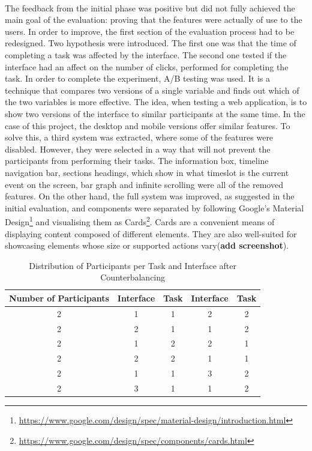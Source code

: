 \documentclass{l4proj}
\begin{document}
\paragraph{}
The feedback from the initial phase was positive but did not fully achieved the main goal of the evaluation: proving that the features were actually of use to the users. In order to improve, the first section of the evaluation process had to be redesigned. Two hypothesis were introduced. The first one was that the time of completing a task was affected by the interface. The second one tested if the interface had an affect on the number of clicks, performed for completing the task. In order to complete the experiment, A/B testing was used. It is a technique that compares two versions of a single variable and finds out which of the two variables is more effective. The idea, when testing a web application, is to show two versions of the interface to similar participants at the same time. In the case of this project, the desktop and mobile versions offer similar features. To solve this, a third system was extracted, where some of the features were disabled. However, they were selected in a way that will not prevent the participants from performing their tasks. The information box, timeline navigation bar, sections headings, which show in what timeslot is the current event on the screen, bar graph and infinite scrolling were all of the removed features. On the other hand, the full system was improved, as suggested in the initial evaluation, and components were separated by following Google's Material Design\footnote{\url{https://www.google.com/design/spec/material-design/introduction.html}} and visualising them as Cards\footnote{\url{https://www.google.com/design/spec/components/cards.html}}. Cards are a convenient means of displaying content composed of different elements. They are also well-suited for showcasing elements whose size or supported actions vary(\textbf{add screenshot}).

\begin{table}[H]
	\centering
	\begin{tabular}{|c|c|c|c|c|} \hline
		Number of Participants&	Interface & Task &	Interface & Task \\ \hline
		2 	& 1	& 1	& 2 & 2  \\ \hline
		2	& 2	& 1	& 1 & 2  \\ \hline
		2 	& 1	& 2	& 2 & 1  \\ \hline
		2	& 2	& 2 & 1 & 1  \\ \hline
		2 	& 1	& 1	& 3 & 2  \\ \hline
		2	& 3	& 1	& 1 & 2  \\ \hline
	\end{tabular}
	\caption{Distribution of Participants per Task and Interface after Counterbalancing}
	\label{tab:counterbalancing}
\end{table}
\end{document}
